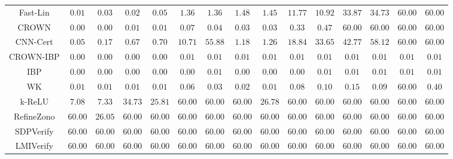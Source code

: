\begin{table*}
{\begin{tabular}{c|c|c|c|c|c|c|c|c|c|c|c|c|c|c}
     Fast-Lin &        $0.01$ &        $0.03$ &        $0.02$ &        $0.05$ &        $1.36$ &        $1.36$ &        $1.48$ &        $1.45$ &       $11.77$ &       $10.92$ &       $33.87$ &       $34.73$ &       $60.00$ &       $60.00$ \\
        CROWN &        $0.00$ &        $0.00$ &        $0.01$ &        $0.01$ &        $0.07$ &        $0.04$ &        $0.03$ &        $0.03$ &        $0.33$ &        $0.47$ &       $60.00$ &       $60.00$ &       $60.00$ &       $60.00$ \\
     CNN-Cert &        $0.05$ &        $0.17$ &        $0.67$ &        $0.70$ &       $10.71$ &       $55.88$ &        $1.18$ &        $1.26$ &       $18.84$ &       $33.65$ &       $42.77$ &       $58.12$ &       $60.00$ &       $60.00$ \\
    CROWN-IBP &        $0.00$ &        $0.00$ &        $0.00$ &        $0.00$ &        $0.01$ &        $0.01$ &        $0.01$ &        $0.01$ &        $0.01$ &        $0.01$ &        $0.01$ &        $0.01$ &        $0.01$ &        $0.01$ \\
          IBP &        $0.00$ &        $0.00$ &        $0.00$ &        $0.00$ &        $0.00$ &        $0.01$ &        $0.00$ &        $0.00$ &        $0.00$ &        $0.01$ &        $0.01$ &        $0.01$ &        $0.01$ &        $0.01$ \\
           WK &        $0.01$ &        $0.01$ &        $0.01$ &        $0.01$ &        $0.06$ &        $0.03$ &        $0.02$ &        $0.01$ &        $0.08$ &        $0.10$ &        $0.15$ &        $0.09$ &       $60.00$ &        $0.40$ \\
       k-ReLU &        $7.08$ &        $7.33$ &       $34.73$ &       $25.81$ &       $60.00$ &       $60.00$ &       $60.00$ &       $26.78$ &       $60.00$ &       $60.00$ &       $60.00$ &       $60.00$ &       $60.00$ &       $60.00$ \\
   RefineZono &       $60.00$ &       $26.05$ &       $60.00$ &       $60.00$ &       $60.00$ &       $60.00$ &       $60.00$ &       $60.00$ &       $60.00$ &       $60.00$ &       $60.00$ &       $60.00$ &       $60.00$ &       $60.00$ \\
    SDPVerify &       $60.00$ &       $60.00$ &       $60.00$ &       $60.00$ &       $60.00$ &       $60.00$ &       $60.00$ &       $60.00$ &       $60.00$ &       $60.00$ &       $60.00$ &       $60.00$ &       $60.00$ &       $60.00$ \\
    LMIVerify &       $60.00$ &       $60.00$ &       $60.00$ &       $60.00$ &       $60.00$ &       $60.00$ &       $60.00$ &       $60.00$ &       $60.00$ &       $60.00$ &       $60.00$ &       $60.00$ &       $60.00$ &       $60.00$ \\

\end{tabular}}
\end{table*}
